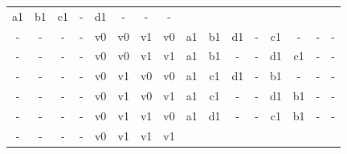 \begin{table}[H]
{\begin{minipage}{\textwidth}
\begin{tabular}{cccccccccccccccc}
		\multicolumn{1}{|c}{a1} & \multicolumn{1}{c}{b1} & \multicolumn{1}{c}{c1}& \multicolumn{1}{c}{-} &
		\multicolumn{1}{c}{d1} &
		\multicolumn{1}{c}{-} &
		\multicolumn{1}{c}{-}&
		\multicolumn{1}{c}{-} \\
		\multicolumn{1}{c}{-} & \multicolumn{1}{c}{-} & \multicolumn{1}{c}{-} & \multicolumn{1}{c}{-} &
		\multicolumn{1}{c}{v0} & \multicolumn{1}{c}{v0} & \multicolumn{1}{c}{v1} & \multicolumn{1}{c}{v0} &
		\multicolumn{1}{|c}{a1} & \multicolumn{1}{c}{b1} & \multicolumn{1}{c}{d1}& \multicolumn{1}{c}{-} &
		\multicolumn{1}{c}{c1} &
		\multicolumn{1}{c}{-} &
		\multicolumn{1}{c}{-}&
		\multicolumn{1}{c}{-} \\
		\multicolumn{1}{c}{-} & \multicolumn{1}{c}{-} & \multicolumn{1}{c}{-} & \multicolumn{1}{c}{-} &
		\multicolumn{1}{c}{v0} & \multicolumn{1}{c}{v0} & \multicolumn{1}{c}{v1} & \multicolumn{1}{c}{v1} &
		\multicolumn{1}{|c}{a1} & \multicolumn{1}{c}{b1} & \multicolumn{1}{c}{-}& \multicolumn{1}{c}{-} &
		\multicolumn{1}{c}{d1} &
		\multicolumn{1}{c}{c1} &
		\multicolumn{1}{c}{-}&
		\multicolumn{1}{c}{-} \\
		\multicolumn{1}{c}{-} & \multicolumn{1}{c}{-} & \multicolumn{1}{c}{-} & \multicolumn{1}{c}{-} &
		\multicolumn{1}{c}{v0} & \multicolumn{1}{c}{v1} & \multicolumn{1}{c}{v0} & \multicolumn{1}{c}{v0} &
		\multicolumn{1}{|c}{a1} & \multicolumn{1}{c}{c1} & \multicolumn{1}{c}{d1}& \multicolumn{1}{c}{-} &
		\multicolumn{1}{c}{b1} &
		\multicolumn{1}{c}{-} &
		\multicolumn{1}{c}{-}&
		\multicolumn{1}{c}{-} \\
		\multicolumn{1}{c}{-} & \multicolumn{1}{c}{-} & \multicolumn{1}{c}{-} & \multicolumn{1}{c}{-} &
		\multicolumn{1}{c}{v0} & \multicolumn{1}{c}{v1} & \multicolumn{1}{c}{v0} & \multicolumn{1}{c}{v1} &
		\multicolumn{1}{|c}{a1} & \multicolumn{1}{c}{c1} & \multicolumn{1}{c}{-}& \multicolumn{1}{c}{-} &
		\multicolumn{1}{c}{d1} &
		\multicolumn{1}{c}{b1} &
		\multicolumn{1}{c}{-}&
		\multicolumn{1}{c}{-} \\
		\multicolumn{1}{c}{-} & \multicolumn{1}{c}{-} & \multicolumn{1}{c}{-} & \multicolumn{1}{c}{-} &
		\multicolumn{1}{c}{v0} & \multicolumn{1}{c}{v1} & \multicolumn{1}{c}{v1} & \multicolumn{1}{c}{v0} &
		\multicolumn{1}{|c}{a1} & \multicolumn{1}{c}{d1} & \multicolumn{1}{c}{-}& \multicolumn{1}{c}{-} &
		\multicolumn{1}{c}{c1} &
		\multicolumn{1}{c}{b1} &
		\multicolumn{1}{c}{-}&
		\multicolumn{1}{c}{-} \\
		\multicolumn{1}{c}{-} & \multicolumn{1}{c}{-} & \multicolumn{1}{c}{-} & \multicolumn{1}{c}{-} &
		\multicolumn{1}{c}{v0} & \multicolumn{1}{c}{v1} & \multicolumn{1}{c}{v1} & \multicolumn{1}{c}{v1} &

\end{tabular}
\end{minipage}}
\end{table}

